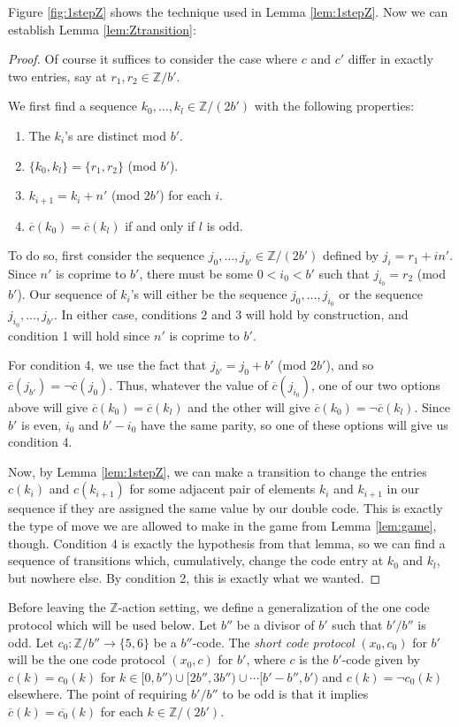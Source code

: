 \documentclass[12pt]{article}
\newcommand{\0}{\varnothing}
\newcommand{\Z}{\mathbb{Z}}
\begin{document}
Figure \ref{fig:1stepZ} shows the technique used in Lemma \ref{lem:1stepZ}. Now we can establish Lemma \ref{lem:Ztransition}:

\begin{proof}
Of course it suffices to consider the case where $c$ and $c'$ differ in exactly two entries, say at $r_1,r_2 \in \Z/b'$.

We first find a sequence $k_0,\ldots,k_l \in \Z/(2b')$ with the following properties:
\begin{enumerate}
    \item The $k_i$'s are distinct mod $b'$.
    \item $\{k_0,k_l\} = \{r_1,r_2\}$ (mod $b'$).
    \item $k_{i+1} = k_i + n'$ (mod $2b'$) for each $i$.
    \item $\overline{c}(k_0) = \overline{c}(k_l)$ if and only if $l$ is odd.
\end{enumerate}
To do so, first consider the sequence $j_0,\ldots,j_{b'} \in \Z/(2b')$ defined by $j_i = r_1 + in'$. Since $n'$ is coprime to $b'$, there must be some $0 < i_0 < b'$ such that $j_{i_0} = r_2$ (mod $b'$). Our sequence of $k_i$'s will either be the sequence $j_0,\ldots,j_{i_0}$ or the sequence $j_{i_0},\ldots,j_{b'}$. In either case, conditions $2$ and $3$ will hold by construction, and condition 1 will hold since $n'$ is coprime to $b'$.

For condition 4, we use the fact that $j_{b'} = j_0 + b'$ (mod $2b'$), and so $\overline{c}(j_{b'}) = \neg \overline{c}(j_0)$. Thus, whatever the value of $\overline{c}(j_{i_0})$, one of our two options above will give $\overline{c}(k_0) = \overline{c}(k_l)$ and the other will give $\overline{c}(k_0) = \neg \overline{c}(k_l)$. Since $b'$ is even, $i_0$ and $b'-i_0$ have the same parity, so one of these options will give us condition 4. 

Now, by Lemma \ref{lem:1stepZ}, we can make a transition to change the entries $c(k_i)$ and $c(k_{i+1})$ for some adjacent pair of elements $k_i$ and $k_{i+1}$ in our sequence if they are assigned the same value by our double code. This is exactly the type of move we are allowed to make in the game from Lemma \ref{lem:game}, though. Condition 4 is exactly the hypothesis from that lemma, so we can find a sequence of transitions which, cumulatively, change the code entry at $k_0$ and $k_l$, but nowhere else. By condition 2, this is exactly what we wanted.
\end{proof}

Before leaving the $\Z$-action setting, we define a generalization of the one code protocol which will be used below. Let $b''$ be a divisor of $b'$ such that $b'/b''$ is odd. Let $c_0:\Z/b'' \rightarrow \{5,6\}$ be a $b''$-code. The \textit{short code protocol} $(x_0,c_0)$ for $b'$ will be the one code protocol $(x_0,c)$ for $b'$, where $c$ is the $b'$-code given by $c(k) = c_0(k)$ for $k \in [0,b'') \cup [2b'',3b'') \cup \cdots [b'-b'',b')$ and $c(k) = \neg c_0(k)$ elsewhere. The point of requiring $b'/b''$ to be odd is that it implies $\overline{c}(k) = \overline{c_0}(k)$ for each $k \in \Z/(2b')$.
\end{document}
